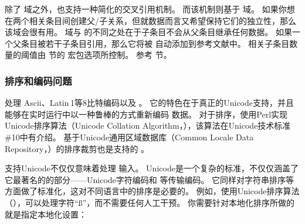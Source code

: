除了  域之外，\biblatex 也支持一种简化的交叉引用机制。
而该机制则基于  域。
如果你想在两个相关条目间创建父\slash 子关系，但就数据而言又希望保持它们的独立性，那么该域会很有用。
 域与  的不同之处在于子条目不会从父条目继承任何数据。
如果一个父条目被若干子条目引用，那么它将被 \biblatex 自动添加到参考文献中。
相关子条目数量的阈值由  节的  宏包选项所控制。
参考  节。

\subsubsection{排序和编码问题}%
\label{bib:cav:enc}


\biber 处理 Ascii、Latin\,1等8比特编码以及 \utf。
它的特色在于真正的Unicode支持，并且能够在实时运行中以一种鲁棒的方式重新编码  数据。
对于排序，\biber 使用Perl实现Unicode排序算法（Unicode Collation Algorithm，），该算法在Unicode技术标准\#10中有介绍。
基于Unicode通用区域数据库（Common Locale Data Repository，）的排序裁剪也是支持的 。



支持Unicode不仅仅意味着处理 \utf 输入。
Unicode是一个复杂的标准，不仅仅涵盖了它最著名的的部分——Unicode字符编码和 \utf 等传输编码。
它同样对字符串排序等方面做了标准化，这对不同语言中的排序是必要的。
例如，使用Unicode排序算法（），\biber 可以处理字符“ß”，而不需要任何人工干预。
你需要针对本地化排序所做的就是指定本地化设置：

